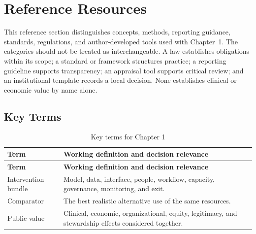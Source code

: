 \section{Reference Resources}
\label{sec:comp-ch01-reference}

This reference section distinguishes concepts, methods, reporting guidance,
standards, regulations, and author-developed tools used with Chapter~1. The
categories should not be treated as interchangeable. A law establishes obligations
within its scope; a standard or framework structures practice; a reporting guideline
supports transparency; an appraisal tool supports critical review; and an
institutional template records a local decision. None establishes clinical or
economic value by name alone. 

\subsection{Key Terms}
\begin{longtable}{@{}p{}p{}@{}}
\caption{Key terms for Chapter 1}
\label{tab:comp-ch01-key-terms}\\
\toprule
\textbf{Term} & \textbf{Working definition and decision relevance} \\
\midrule
\endfirsthead
\toprule
\textbf{Term} & \textbf{Working definition and decision relevance} \\
\midrule
\endhead
\bottomrule
\endlastfoot
Intervention bundle & Model, data, interface, people, workflow, capacity, governance, monitoring, and exit. \\
Comparator & The best realistic alternative use of the same resources. \\
Public value & Clinical, economic, organizational, equity, legitimacy, and stewardship effects considered together. \\
\end{longtable}

